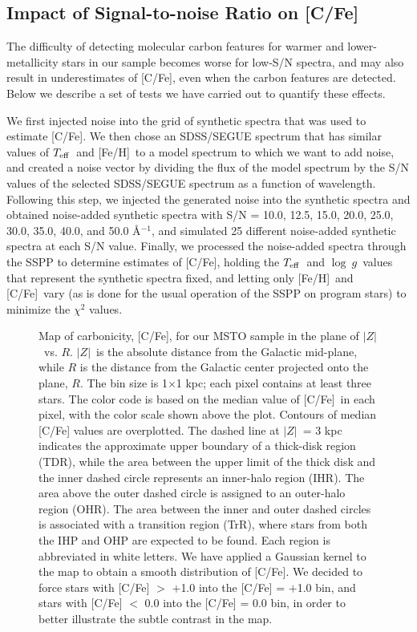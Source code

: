 \documentclass[iop]{emulateapj}
\newcommand*{\teff}{$T_{\rm eff}$}
\newcommand*{\logg}{$\log~g$}
\newcommand*{\feh}{[Fe/H]}
\newcommand*{\cfe}{[C/Fe]}
\newcommand*{\z}{$|Z|$}
\begin{document}
\subsection{Impact of Signal-to-noise Ratio on [C/Fe]}

The difficulty of detecting molecular carbon features for warmer and
lower-metallicity stars in our sample becomes worse for low-S/N spectra,
and may also result in underestimates of [C/Fe], even when the carbon
features are detected. Below we describe a set of tests we have carried
out to quantify these effects.

We first injected noise into the grid of synthetic spectra that was used
to estimate [C/Fe]. We then chose an SDSS/SEGUE spectrum that has similar
values of \teff\ and \feh\ to a model spectrum to which we want to add
noise, and created a noise vector by dividing the flux of the model
spectrum by the S/N values of the selected SDSS/SEGUE spectrum as a
function of wavelength. Following this step, we injected the generated
noise into the synthetic spectra and obtained noise-added synthetic
spectra with S/N = 10.0, 12.5, 15.0, 20.0, 25.0, 30.0, 35.0, 40.0, and
50.0 \AA$^{-1}$, and simulated 25 different noise-added synthetic
spectra at each S/N value. Finally, we processed the noise-added spectra
through the SSPP to determine estimates of [C/Fe], holding the \teff\
and \logg\ values that represent the synthetic spectra fixed, and letting
only \feh\ and \cfe\ vary (as is done for the usual operation of the
SSPP on program stars) to minimize the $\chi^{2}$ values.

\begin{figure}
\centering
{}
\caption{Map of carbonicity, [C/Fe], for our MSTO sample in the plane of \z\
vs. $R$. \z\ is the absolute distance from the Galactic mid-plane,
while $R$ is the distance from the Galactic center projected onto the
plane, $R$. The bin size is 1$\times$1 kpc; each pixel contains at least
three stars. The color code is based on the median value of \cfe\ in
each pixel, with the color scale shown above the plot. Contours of
median [C/Fe] values are overplotted. The dashed line at \z\ = 3 kpc
indicates the approximate upper boundary of a thick-disk region (TDR),
while the area between the upper limit of the thick disk and the inner dashed
circle represents an inner-halo region (IHR). The area above the outer
dashed circle is assigned to an outer-halo region (OHR). The area
between the inner and outer dashed circles is associated with a
transition region (TrR), where stars from both the IHP and OHP are
expected to be found. Each region is abbreviated in white letters. We
have applied a Gaussian kernel to the map to obtain a smooth
distribution of [C/Fe]. We decided to force stars with [C/Fe] $>$ $+$1.0
into the [C/Fe] = $+$1.0 bin, and stars with [C/Fe] $<$ 0.0 into the [C/Fe] =
0.0 bin, in order to better illustrate the subtle contrast in the map.}
\label{fig:cmap}
\end{figure}
\end{document}
